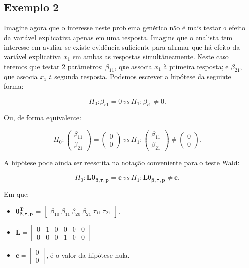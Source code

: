 \subsection{Exemplo 2}

Imagine agora que o interesse neste problema genérico não é mais testar o efeito da variável explicativa apenas em uma resposta. Imagine que o analista tem interesse em avaliar se existe evidência suficiente para afirmar que há efeito da variável explicativa $x_1$ em ambas as respostas simultâneamente. Neste caso teremos que testar 2 parâmetros: $\beta_{11}$, que associa $x_1$ à primeira resposta; e $\beta_{21}$, que associa $x_1$ à segunda resposta. Podemos escrever a hipótese da seguinte forma:

\begin{equation}
H_0: \beta_{r1} = 0 \ vs \ H_1: \beta_{r1} \neq 0.
\end{equation}

Ou, de forma equivalente:

$$
H_0: 
\begin{pmatrix}
\beta_{11} \\ 
\beta_{21}
\end{pmatrix} 
= 
\begin{pmatrix}
0 \\ 
0
\end{pmatrix}
\ vs \ 
H_1: 
\begin{pmatrix}
\beta_{11} \\ 
\beta_{21}
\end{pmatrix} 
\neq
\begin{pmatrix}
0 \\ 
0 
\end{pmatrix}.
$$

A hipótese pode ainda ser reescrita na notação conveniente para o teste Wald:

\begin{equation}
H_0: \boldsymbol{L}\boldsymbol{\theta_{\beta,\tau,p}} = \boldsymbol{c} \ vs \ H_1: \boldsymbol{L}\boldsymbol{\theta_{\beta,\tau,p}} \neq \boldsymbol{c}.
\end{equation}

Em que:

\begin{itemize}
  
  \item $\boldsymbol{\theta_{\beta,\tau,p}^T}$ = $\begin{bmatrix} \beta_{10} \  \beta_{11} \ \beta_{20} \ \beta_{21} \ \tau_{11} \ \tau_{21} \end{bmatrix}$.


\item $\boldsymbol{L} = \begin{bmatrix} 0 & 1 & 0 & 0 & 0 & 0 \\
0 & 0 & 0 & 1 & 0 & 0 \end{bmatrix}$
 
\item $\boldsymbol{c} = \begin{bmatrix} 0 \\ 0 \end{bmatrix}$, é o valor da hipótese nula. 

\end{itemize}

